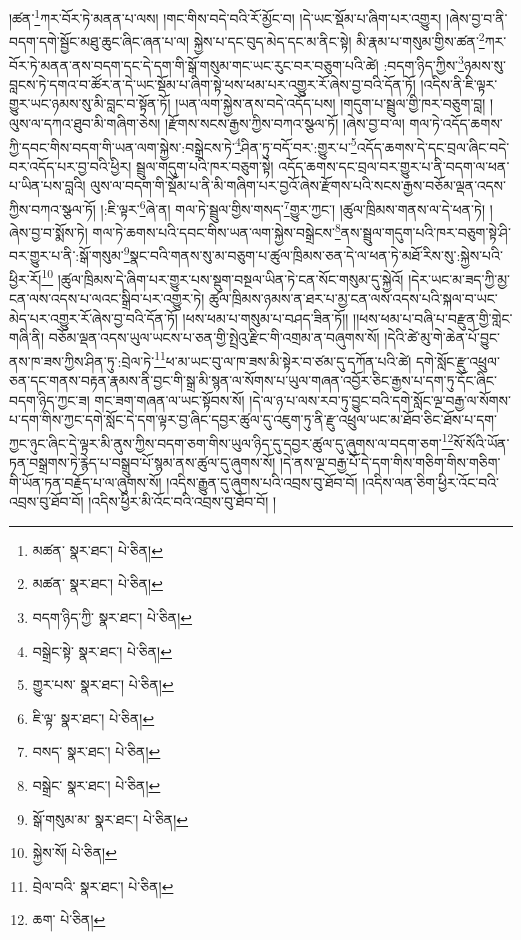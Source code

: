 །ཚན་\footnote{མཚན་  སྣར་ཐང་།  པེ་ཅིན། }ཀར་བོར་ཏེ་མནན་པ་ལས། །གང་གིས་བདེ་བའི་རོ་མྱོང་བ། །དེ་ཡང་སྡོམ་པ་ཞིག་པར་འགྱུར། །ཞེས་བྱ་བ་ནི་བདག་དགེ་སྦྱོང་མཐུ་ཆུང་ཞིང་ཞན་པ་ལ། སྐྱེས་པ་དང་བུད་མེད་དང་མ་ནིང་སྟེ། མི་རྣམ་པ་གསུམ་གྱིས་ཚན་\footnote{མཚན་  སྣར་ཐང་།  པེ་ཅིན། }ཀར་བོར་ཏེ་མནན་ནས་བདག་དང་དེ་དག་གི་སྒོ་གསུམ་གང་ཡང་རུང་བར་བཅུག་པའི་ཚེ། :བདག་ཉིད་ཀྱིས་\footnote{བདག་ཉིད་ཀྱི་  སྣར་ཐང་།  པེ་ཅིན། }ཉམས་སུ་བླངས་ཏེ་དགའ་བ་ཚོར་ན་དེ་ཡང་སྡོམ་པ་ཞིག་སྟེ་ཕས་ཕམ་པར་འགྱུར་རོ་ཞེས་བྱ་བའི་དོན་ཏོ། །འདིས་ནི་ཇི་ལྟར་གྱུར་ཡང་ཉམས་སུ་མི་བླང་བ་སྟོན་ཏོ། །ཡན་ལག་སྐྱེས་ནས་བདེ་འདོད་པས། །གདུག་པ་སྦྲུལ་གྱི་ཁར་བཅུག་བླ། །ལུས་ལ་དཀའ་ཐུབ་མི་གཞིག་ཅེས། །རྫོགས་སངས་རྒྱས་ཀྱིས་བཀའ་སྩལ་ཏོ། །ཞེས་བྱ་བ་ལ། གལ་ཏེ་འདོད་ཆགས་ཀྱི་དབང་གིས་བདག་གི་ཡན་ལག་སྐྱེས་:བསྒྲེངས་ཏེ་\footnote{བསྒྲེང་སྟེ་  སྣར་ཐང་།  པེ་ཅིན། }ཤིན་ཏུ་བདོ་བར་:གྱུར་པ་\footnote{གྱུར་པས་  སྣར་ཐང་།  པེ་ཅིན། }འདོད་ཆགས་དེ་དང་བྲལ་ཞིང་བདེ་བར་འདོད་པར་བྱ་བའི་ཕྱིར། སྦྲུལ་གདུག་པའི་ཁར་བཅུག་སྟེ། འདོད་ཆགས་དང་བྲལ་བར་གྱུར་པ་ནི་བདག་ལ་ཕན་པ་ཡིན་པས་བླའི། ལུས་ལ་བདག་གི་སྡོམ་པ་ནི་མི་གཞིག་པར་བྱའོ་ཞེས་རྫོགས་པའི་སངས་རྒྱས་བཅོམ་ལྡན་འདས་ཀྱིས་བཀའ་སྩལ་ཏོ། །:ཇི་ལྟར་\footnote{ཇི་ལྟ་  སྣར་ཐང་།  པེ་ཅིན། }ཞེ་ན། གལ་ཏེ་སྦྲུལ་གྱིས་གསད་\footnote{བསད་  སྣར་ཐང་།  པེ་ཅིན། }གྱུར་ཀྱང་། །ཚུལ་ཁྲིམས་གནས་ལ་དེ་ཕན་ཏེ། །ཞེས་བྱ་བ་སྨོས་ཏེ། གལ་ཏེ་ཆགས་པའི་དབང་གིས་ཡན་ལག་སྐྱེས་བསྒྲེངས་\footnote{བསྒྲེང་  སྣར་ཐང་།  པེ་ཅིན། }ནས་སྦྲུལ་གདུག་པའི་ཁར་བཅུག་སྟེ་ཤི་བར་གྱུར་པ་ནི་:སྒོ་གསུམ་\footnote{སྒོ་གསུམ་མ་  སྣར་ཐང་།  པེ་ཅིན། }སྣང་བའི་གནས་སུ་མ་བཅུག་པ་ཚུལ་ཁྲིམས་ཅན་དེ་ལ་ཕན་ཏེ་མཐོ་རིས་སུ་:སྐྱེས་པའི་ཕྱིར་རོ།\footnote{སྐྱེས་སོ།  པེ་ཅིན། } །ཚུལ་ཁྲིམས་དེ་ཞིག་པར་གྱུར་པས་སྡུག་བསྔལ་ཡིན་ཏེ་ངན་སོང་གསུམ་དུ་སྐྱེའོ། །དེར་ཡང་མ་ཟད་ཀྱི་མྱ་ངན་ལས་འདས་པ་ལའང་སྒྲིབ་པར་འགྱུར་ཏེ། ཚུལ་ཁྲིམས་ཉམས་ན་ཐར་པ་མྱ་ངན་ལས་འདས་པའི་སྐལ་བ་ཡང་མེད་པར་འགྱུར་རོ་ཞེས་བྱ་བའི་དོན་ཏོ། །ཕས་ཕམ་པ་གསུམ་པ་བཤད་ཟིན་ཏོ།། །།ཕས་ཕམ་པ་བཞི་པ་བརྫུན་གྱི་གླེང་གཞི་ནི། བཅོམ་ལྡན་འདས་ཡུལ་ཡངས་པ་ཅན་གྱི་སྤྲེའུ་རྫིང་གི་འགྲམ་ན་བཞུགས་སོ། །དེའི་ཚེ་མུ་གེ་ཆེན་པོ་བྱུང་ནས་ཁ་ཟས་ཀྱིས་ཤིན་ཏུ་:བྲེལ་ཏེ་\footnote{བྲེལ་བའི་  སྣར་ཐང་།  པེ་ཅིན། }ཕ་མ་ཡང་བུ་ལ་ཁ་ཟས་མི་སྟེར་བ་ཙམ་དུ་དཀོན་པའི་ཚེ། དགེ་སློང་རྫུ་འཕྲུལ་ཅན་དང་གནས་བརྟན་རྣམས་ནི་བྱང་གི་སྒྲ་མི་སྙན་ལ་སོགས་པ་ཡུལ་གཞན་འབྱོར་ཅིང་རྒྱས་པ་དག་ཏུ་དོང་ཞིང་བདག་ཉིད་ཀྱང་ཟ། གང་ཟག་གཞན་ལ་ཡང་སྟོབས་སོ། །དེ་ལ་ཉ་པ་ལས་རབ་ཏུ་བྱུང་བའི་དགེ་སློང་ལྔ་བརྒྱ་ལ་སོགས་པ་དག་གིས་ཀྱང་དགེ་སློང་དེ་དག་ལྟར་བྱ་ཞིང་དབྱར་ཚུལ་དུ་འཇུག་ཏུ་ནི་རྫུ་འཕྲུལ་ཡང་མ་ཐོབ་ཅིང་ཐོས་པ་དག་ཀྱང་ཉུང་ཞིང་དེ་ལྟར་མི་ནུས་ཀྱིས་བདག་ཅག་གིས་ཡུལ་ཉིད་དུ་དབྱར་ཚུལ་དུ་ཞུགས་ལ་བདག་ཅག་\footnote{ཆག་  པེ་ཅིན། }སོ་སོའི་ཡོན་ཏན་བསྒྲགས་ཏེ་རྙེད་པ་བསྒྲུབ་པོ་སྙམ་ནས་ཚུལ་དུ་ཞུགས་སོ། །དེ་ནས་ལྔ་བརྒྱ་པོ་དེ་དག་གིས་གཅིག་གིས་གཅིག་གི་ཡོན་ཏན་བརྗོད་པ་ལ་ཞུགས་སོ། །འདིས་རྒྱུན་དུ་ཞུགས་པའི་འབྲས་བུ་ཐོབ་བོ། །འདིས་ལན་ཅིག་ཕྱིར་འོང་བའི་འབྲས་བུ་ཐོབ་བོ། །འདིས་ཕྱིར་མི་འོང་བའི་འབྲས་བུ་ཐོབ་བོ། །
